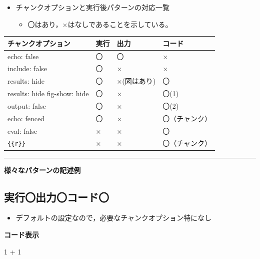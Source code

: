 \documentclass[
  b5paper,
  xelatex, ja=standard]{bxjsbook}
\newenvironment{Shaded}{\begin{snugshade}}{\end{snugshade}}
\newcommand{\DecValTok}[1]{\textcolor[rgb]{0.68,0.00,0.00}{#1}}
\newcommand{\SpecialCharTok}[1]{\textcolor[rgb]{0.37,0.37,0.37}{#1}}
\providecommand{\tightlist}{%
  \setlength{\itemsep}{0pt}\setlength{\parskip}{0pt}}\usepackage{longtable,booktabs,array}
\begin{document}
\begin{itemize}
\tightlist
\item
  チャンクオプションと実行後パターンの対応一覧

  \begin{itemize}
  \tightlist
  \item
    〇はあり，×はなしであることを示している。
  \end{itemize}
\end{itemize}

\begin{longtable}[]{@{}llll@{}}
\toprule\noalign{}
チャンクオプション & 実行 & 出力 & コード \\
\midrule\noalign{}
\endhead
\bottomrule\noalign{}
\endlastfoot
echo: false & 〇 & 〇 & × \\
include: false & 〇 & × & × \\
results: hide & 〇 & ×(図はあり) & 〇 \\
results: hide fig-show: hide & 〇 & × & 〇(1) \\
output: false & 〇 & × & 〇(2) \\
echo: fenced & 〇 & × & 〇（チャンク） \\
eval: false & × & × & 〇 \\
\texttt{\{\{r\}\}} & × & × & 〇（チャンク） \\
\end{longtable}

\begin{center}\rule{0.5\linewidth}{0.5pt}\end{center}

\textbf{様々なパターンの記述例}

\subsection{実行〇\textbar 出力〇\textbar コード〇}

\begin{itemize}
\tightlist
\item
  デフォルトの設定なので，必要なチャンクオプション特になし
\end{itemize}

\textbf{コード表示}

\begin{Shaded}
\begin{Highlighting}[]
\DecValTok{1} \SpecialCharTok{+} \DecValTok{1}
\end{Highlighting}
\end{Shaded}
\end{document}
